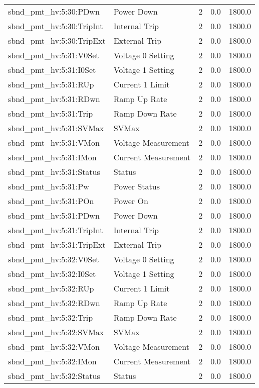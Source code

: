 \begin{center}
\begin{longtable}{l | l l l l }
sbnd\_pmt\_hv:5:30:PDwn & Power Down & 2 & 0.0 & 1800.0\\ 
sbnd\_pmt\_hv:5:30:TripInt & Internal Trip & 2 & 0.0 & 1800.0\\ 
sbnd\_pmt\_hv:5:30:TripExt & External Trip & 2 & 0.0 & 1800.0\\ 
sbnd\_pmt\_hv:5:31:V0Set & Voltage 0 Setting & 2 & 0.0 & 1800.0\\ 
sbnd\_pmt\_hv:5:31:I0Set & Voltage 1 Setting & 2 & 0.0 & 1800.0\\ 
sbnd\_pmt\_hv:5:31:RUp & Current 1 Limit & 2 & 0.0 & 1800.0\\ 
sbnd\_pmt\_hv:5:31:RDwn & Ramp Up Rate & 2 & 0.0 & 1800.0\\ 
sbnd\_pmt\_hv:5:31:Trip & Ramp Down Rate & 2 & 0.0 & 1800.0\\ 
sbnd\_pmt\_hv:5:31:SVMax & SVMax & 2 & 0.0 & 1800.0\\ 
sbnd\_pmt\_hv:5:31:VMon & Voltage Measurement & 2 & 0.0 & 1800.0\\ 
sbnd\_pmt\_hv:5:31:IMon & Current Measurement & 2 & 0.0 & 1800.0\\ 
sbnd\_pmt\_hv:5:31:Status & Status & 2 & 0.0 & 1800.0\\ 
sbnd\_pmt\_hv:5:31:Pw & Power Status & 2 & 0.0 & 1800.0\\ 
sbnd\_pmt\_hv:5:31:POn & Power On & 2 & 0.0 & 1800.0\\ 
sbnd\_pmt\_hv:5:31:PDwn & Power Down & 2 & 0.0 & 1800.0\\ 
sbnd\_pmt\_hv:5:31:TripInt & Internal Trip & 2 & 0.0 & 1800.0\\ 
sbnd\_pmt\_hv:5:31:TripExt & External Trip & 2 & 0.0 & 1800.0\\ 
sbnd\_pmt\_hv:5:32:V0Set & Voltage 0 Setting & 2 & 0.0 & 1800.0\\ 
sbnd\_pmt\_hv:5:32:I0Set & Voltage 1 Setting & 2 & 0.0 & 1800.0\\ 
sbnd\_pmt\_hv:5:32:RUp & Current 1 Limit & 2 & 0.0 & 1800.0\\ 
sbnd\_pmt\_hv:5:32:RDwn & Ramp Up Rate & 2 & 0.0 & 1800.0\\ 
sbnd\_pmt\_hv:5:32:Trip & Ramp Down Rate & 2 & 0.0 & 1800.0\\ 
sbnd\_pmt\_hv:5:32:SVMax & SVMax & 2 & 0.0 & 1800.0\\ 
sbnd\_pmt\_hv:5:32:VMon & Voltage Measurement & 2 & 0.0 & 1800.0\\ 
sbnd\_pmt\_hv:5:32:IMon & Current Measurement & 2 & 0.0 & 1800.0\\ 
sbnd\_pmt\_hv:5:32:Status & Status & 2 & 0.0 & 1800.0\\ 

\end{longtable}
\end{center}
